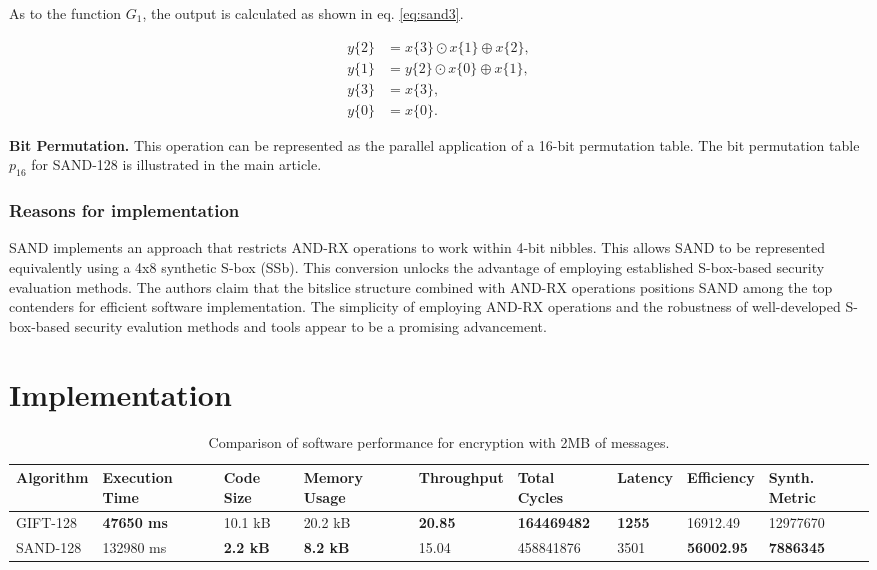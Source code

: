 \documentclass[conference]{IEEEtran}
\begin{document}
As to the function $G_1$, the output is calculated as shown in eq. \ref{eq:sand3}.

\begin{equation}
  \begin{aligned}
  y\{2\} &= x\{3\} \odot x\{1\} \oplus x\{2\}, \\
  y\{1\} &= y\{2\} \odot x\{0\} \oplus x\{1\}, \\
  y\{3\} &= x\{3\}, \\
  y\{0\} &= x\{0\}.
  \end{aligned}
  \label{eq:sand3}
\end{equation}

\textbf{Bit Permutation.} This operation can be represented as the parallel application of a 16-bit permutation table. The bit permutation table $p_{16}$ for SAND-128 is illustrated in the main article\cite{SAND}.


\subsubsection{Reasons for implementation}
SAND implements an approach that restricts AND-RX operations to work within 4-bit nibbles. This allows SAND to be represented equivalently using a 4x8 synthetic S-box (SSb). This conversion unlocks the advantage of employing established S-box-based security evaluation methods. The authors claim that the bitslice structure combined with AND-RX operations positions SAND among the top contenders for efficient software implementation. The simplicity of employing AND-RX operations and the robustness of well-developed S-box-based security evalution methods and tools appear to be a promising advancement.

\section{Implementation}\label{sec:imp}


\begin{table}[ht]
  \centering
  \caption{Comparison of software performance for encryption with 2MB of messages.}
  \begin{tabular}{lllllllll} 
   \toprule
   Algorithm & Execution Time & Code Size & Memory Usage & Throughput & Total Cycles & Latency & Efficiency & Synth. Metric\\ 
   \midrule
   GIFT-128 & \textbf{47650 ms} & 10.1 kB & 20.2 kB & \textbf{20.85} & \textbf{164469482} & \textbf{1255} & 16912.49 & 12977670 \\
   SAND-128 & 132980 ms & \textbf{2.2 kB} & \textbf{8.2 kB} & 15.04 & 458841876 & 3501 & \textbf{56002.95} & \textbf{7886345}  \\
   \bottomrule
  \end{tabular}
  \label{table:enc}
\end{table}
\end{document}
